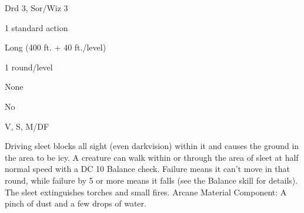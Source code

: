 
\begin{description*}
\item[Level:] Drd 3, Sor/Wiz 3
\item[Casting Time:] 1 standard action
\item[Range:] Long (400 ft. + 40 ft./level)
\item[Duration:] 1 round/level
\item[Saving Throw:] None
\item[Spell Resistance:] No
\item[Components:] V, S, M/DF
\end{description*}

Driving sleet blocks all sight (even darkvision) within it and causes the ground
in the area to be icy. A creature can walk within or through the area of sleet
at half normal speed with a DC 10 Balance check. Failure means it can't move in
that round, while failure by 5 or more means it falls (see the Balance skill for
details).
The sleet extinguishes torches and small fires.
Arcane Material Component: A pinch of dust and a few drops of water.